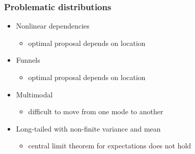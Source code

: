 \documentclass[10pt,handout]{beamer}
\begin{document}
\begin{frame}

\frametitle{ Problematic distributions}

  \begin{itemize}
  \item<1-> Nonlinear dependencies
    \begin{itemize}
    \item optimal proposal depends on location
    \end{itemize}
  \item<2-> Funnels
    \begin{itemize}
    \item optimal proposal depends on location
    \end{itemize}
  \item<3-> Multimodal
    \begin{itemize}
    \item difficult to move from one mode to another
    \end{itemize}
  \item<4-> Long-tailed with non-finite variance and mean
    \begin{itemize}
    \item central limit theorem for expectations does not hold
    \end{itemize}
  \end{itemize}

\end{frame}

\end{document}
